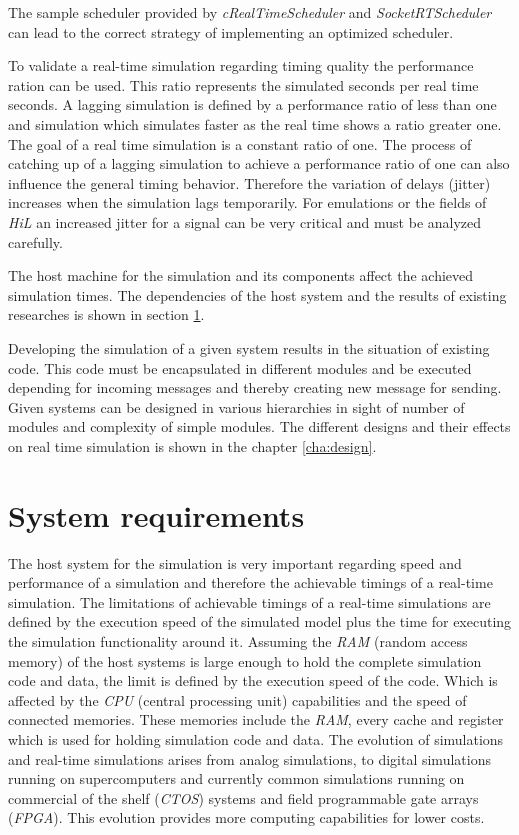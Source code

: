 The sample scheduler provided by \emph{cRealTimeScheduler} and \emph{SocketRTScheduler} can lead to the correct strategy of implementing an optimized scheduler.

To validate a real-time simulation regarding timing quality the performance ration can be used.
This ratio represents the simulated seconds per real time seconds.
A lagging simulation is defined by a performance ratio of less than one and simulation which simulates faster as the real time shows a ratio greater one.
The goal of a real time simulation is a constant ratio of one.
The process of catching up of a lagging simulation to achieve a performance ratio of one can also influence the general timing behavior.
Therefore the variation of delays (jitter) increases when the simulation lags temporarily.
For emulations or the fields of \emph{HiL} an increased jitter for a signal can be very critical and must be analyzed carefully.

The host machine for the simulation and its components affect the achieved simulation times.
The dependencies of the host system and the results of existing researches is shown in section \ref{sec:simulation_requirements}.

Developing the simulation of a given system results in the situation of existing code.
This code must be encapsulated in different modules and be executed depending for incoming messages and thereby creating new message for sending.
Given systems can be designed in various hierarchies in sight of number of modules and complexity of simple modules.
The different designs and their effects on real time simulation is shown in the chapter \ref{cha:design}.

\section{System requirements}
\label{sec:simulation_requirements}
The host system for the simulation is very important regarding speed and performance of a simulation and therefore the achievable timings of a real-time simulation.
The limitations of achievable timings of a real-time simulations are defined by the execution speed of the simulated model plus the time for executing the simulation functionality around it.
Assuming the \emph{RAM} (random access memory) of the host systems is large enough to hold the complete simulation code and data, the limit is defined by the execution speed of the code.
Which is affected by the \emph{CPU} (central processing unit) capabilities and the speed of connected memories.
These memories include the \emph{RAM}, every cache and register which is used for holding simulation code and data.
The evolution of simulations and real-time simulations arises from analog simulations, to digital simulations running on supercomputers and currently common simulations running on commercial of the shelf (\emph{CTOS}) systems and field programmable gate arrays (\emph{FPGA}).
This evolution provides more computing capabilities for lower costs. \cite[section IV]{belanger_what_2010}